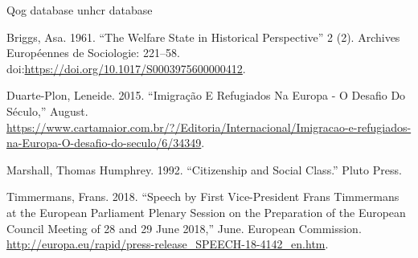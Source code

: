 \documentclass[]{elsarticle} %
\begin{document}
Qog database unhcr database

\hypertarget{refs}{}
\hypertarget{ref-briggs}{}
Briggs, Asa. 1961. ``The Welfare State in Historical Perspective'' 2
(2). Archives Européennes de Sociologie: 221--58.
doi:\href{https://doi.org/https://doi.org/10.1017/S0003975600000412}{https://doi.org/10.1017/S0003975600000412}.

\hypertarget{ref-leneide}{}
Duarte-Plon, Leneide. 2015. ``Imigração E Refugiados Na Europa - O
Desafio Do Século,'' August.
\url{https://www.cartamaior.com.br/?/Editoria/Internacional/Imigracao-e-refugiados-na-Europa-O-desafio-do-seculo/6/34349}.

\hypertarget{ref-marshall}{}
Marshall, Thomas Humphrey. 1992. ``Citizenship and Social Class.'' Pluto
Press.

\hypertarget{ref-franstimmermans}{}
Timmermans, Frans. 2018. ``Speech by First Vice-President Frans
Timmermans at the European Parliament Plenary Session on the Preparation
of the European Council Meeting of 28 and 29 June 2018,'' June. European
Commission.
\url{http://europa.eu/rapid/press-release_SPEECH-18-4142_en.htm}.
\end{document}
